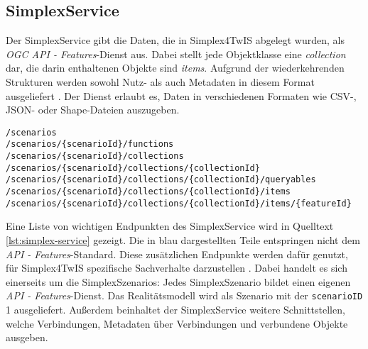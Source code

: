 \subsection{SimplexService}
\label{sec:simplex-service}

Der SimplexService gibt die Daten, die in Simplex4TwIS abgelegt wurden, als \textit{OGC API - Features}-Dienst aus. Dabei stellt jede Objektklasse eine \textit{collection} dar, die darin enthaltenen Objekte sind \textit{items}. Aufgrund der wiederkehrenden Strukturen werden sowohl Nutz- als auch Metadaten in diesem Format ausgeliefert \parencite{grossmannEnvVisioService2022}. Der Dienst erlaubt es, Daten in verschiedenen Formaten wie \acs{CSV}-, \acs{JSON}- oder Shape-Dateien auszugeben.

\begin{lstlisting}[float=!ht,language=simplexservice,caption={[Ausgewählte Endpunkte des SimplexService]Ausgewählte Endpunkte des SimplexService. Schwarz dargestellte Abschnitte sind Teil des \textit{OGC API - Features}-Standard, während die blauen Teile vom SimplexService hinzugefügt wurden. \parencite{simplex4datagmbhSimplexServiceDokumenation}},label=lst:simplex-service]
/scenarios
/scenarios/{scenarioId}/functions
/scenarios/{scenarioId}/collections
/scenarios/{scenarioId}/collections/{collectionId}
/scenarios/{scenarioId}/collections/{collectionId}/queryables
/scenarios/{scenarioId}/collections/{collectionId}/items
/scenarios/{scenarioId}/collections/{collectionId}/items/{featureId}
\end{lstlisting}

Eine Liste von wichtigen Endpunkten des SimplexService wird in Quelltext \ref{lst:simplex-service} gezeigt. Die in blau dargestellten Teile entspringen nicht dem \textit{API - Features}-Standard. Diese zusätzlichen Endpunkte werden dafür genutzt, für Simplex4TwIS spezifische Sachverhalte darzustellen \parencite{grossmannEnvVisioService2022}. Dabei handelt es sich einerseits um die SimplexSzenarios: Jedes SimplexSzenario bildet einen eigenen \textit{API - Features}-Dienst. Das Realitätsmodell wird als Szenario mit der \texttt{scenarioID} 1 ausgeliefert. Außerdem beinhaltet der SimplexService weitere Schnittstellen, welche Verbindungen, Metadaten über Verbindungen und verbundene Objekte ausgeben.
